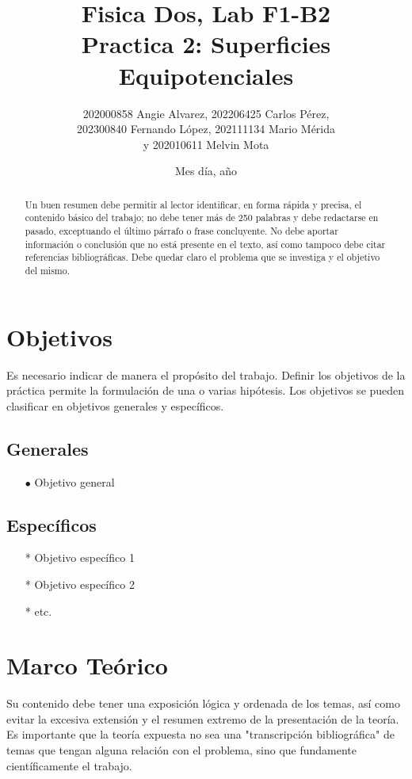 \documentclass[letterpaper,11pt]{article}
\begin{document}
%
%
%
\title{Fisica Dos, Lab F1-B2 \\\textbf{Practica 2: Superficies Equipotenciales}}
\author{202000858 Angie Alvarez, 202206425 Carlos Pérez,\\
202300840 Fernando López, 202111134 Mario Mérida\\ 
y 202010611 Melvin Mota}
\date{Mes día, año}
\maketitle
%
\begin{abstract}
Un buen resumen debe permitir al lector identificar, en forma rápida y precisa, 
el contenido básico del trabajo; no debe tener más de 250 palabras y debe redactarse en pasado, exceptuando el último párrafo o frase concluyente. No debe aportar información o conclusión que no está presente en el texto, así como tampoco debe citar referencias bibliográficas. Debe quedar claro el problema que se investiga y el objetivo del mismo. 
\end{abstract}
%
%
%
%
\section{Objetivos}
%
Es necesario indicar de manera el propósito del trabajo. Definir los objetivos de la
práctica permite la formulación de una o varias hipótesis. Los objetivos se pueden
clasificar en objetivos generales y específicos.
%
\subsection{Generales}
\begin{itemize}
\item[$\bullet$] Objetivo general
\end{itemize}
\subsection{Específicos}
\begin{itemize}
\item[*] Objetivo específico 1
\item[*] Objetivo específico 2
\item[*] etc.
\end{itemize}
% 
\section{Marco Teórico}
%
Su contenido debe tener una exposición lógica y ordenada de los temas, así como
evitar la excesiva extensión y el resumen extremo de la presentación de la teoría. Es
importante que la teoría expuesta no sea una "transcripción bibliográfica" de temas
que tengan alguna relación con el problema, sino que fundamente científicamente el
trabajo.
%
\end{document}
